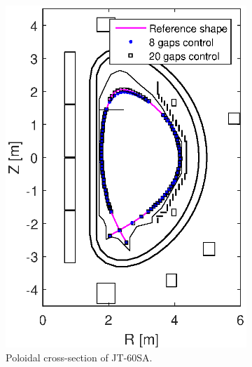 \begin{figure}
	\centering
	\begin{subfigure}[b]{0.32\textwidth}
		\includegraphics[width=\textwidth] {Chp3/Ref_20gaps_8gaps_minor_2.eps}  
		\caption{Poloidal cross-section of JT-60SA.\label{figure:minor_big} }
	\end{subfigure}
	~
	\begin{subfigure}[b]{0.32\textwidth}

\end{subfigure}
\end{figure}
